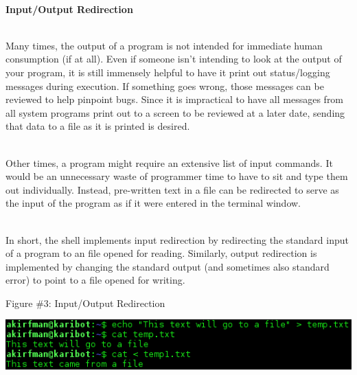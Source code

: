 \documentclass[12pt]{extarticle}
\newenvironment{myindentpar}[1]%
 {\begin{list}{}%
         {\setlength{\leftmargin}{#1}}%
         \item[]%
 }
 {\end{list}}
\begin{document}
\begin{myindentpar}{5mm}

\ \\
\textbf{Input/Output Redirection}

\ \\
Many times, the output of a program is not intended for immediate human consumption (if at all).  Even if someone isn't intending to look at the output of your program, it is still immensely helpful to have it print out status/logging messages during execution.  If something goes wrong, those messages can be reviewed to help pinpoint bugs.  Since it is impractical to have all messages from all system programs print out to a screen to be reviewed at a later date, sending that data to a file as it is printed is desired.  

\ \\
Other times, a program might require an extensive list of input commands.  It would be an unnecessary waste of programmer time to have to sit and type them out individually.  Instead, pre-written text in a file can be redirected to serve as the input of the program as if it were entered in the terminal window.  

\ \\
In short, the shell implements input redirection by redirecting the standard input of a program to an file opened for reading.  Similarly, output redirection is implemented by changing the standard output (and sometimes also standard error) to point to a file opened for writing.  

\begin{center}
    Figure \#3: Input/Output Redirection
\end{center}
\begin{center}
    \includegraphics{redirection.png}
\end{center}








\end{myindentpar}
\end{document}
